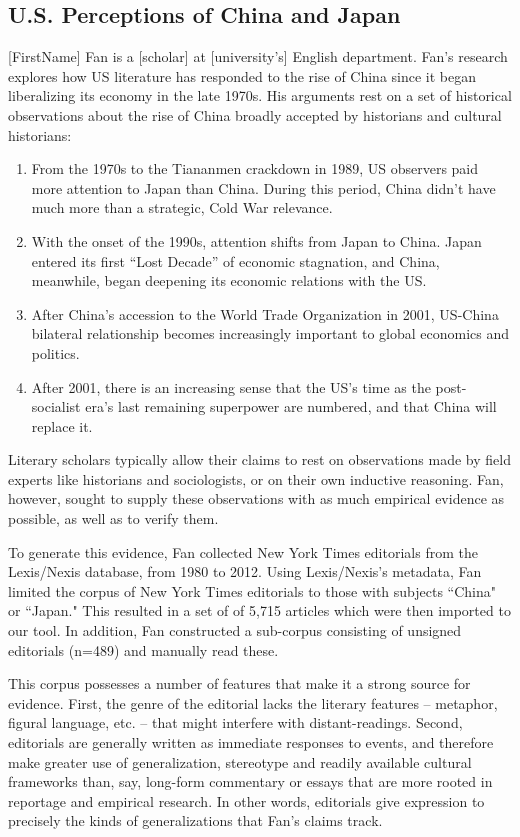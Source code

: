 \documentclass{sig-alternate}
\begin{document}
\subsection{U.S. Perceptions of China and Japan}
[FirstName] Fan is a [scholar] at [university's] English department. Fan's research explores how US literature has responded to the rise of China since it began liberalizing its economy in the late 1970s.  His arguments rest on a set of historical observations about the rise of China  broadly accepted by historians and cultural historians: 
\begin{enumerate}
\item From the 1970s to the Tiananmen crackdown in 1989, US observers paid more attention to Japan than China. During this period, China didn't have much more than a strategic, Cold War relevance. 
\item With the onset of the 1990s, attention shifts from Japan to China. Japan entered its first ``Lost Decade'' of economic stagnation, and China, meanwhile, began deepening its economic relations with the US.
\item After China's accession to the World Trade Organization in 2001, US-China bilateral relationship becomes increasingly important to global economics and politics.
\item After 2001, there is an increasing sense that the US's time as the post-socialist era's last remaining superpower are numbered, and that China will replace it.
\end{enumerate}
Literary scholars typically allow their claims to rest on observations made by field experts like historians and sociologists, or on their own inductive reasoning. Fan, however, sought to supply these observations with as much empirical evidence as possible, as well as to verify them.

To generate this evidence, Fan collected New York Times editorials from  the Lexis/Nexis database, from 1980 to 2012. Using Lexis/Nexis's metadata, Fan limited the corpus of New York Times editorials to those with subjects ``China" or ``Japan." This resulted in a set of of 5,715 articles which were then imported to our tool. In addition, Fan constructed a sub-corpus consisting of unsigned editorials (n=489) and manually read these.

This corpus possesses a number of features that make it a strong source for evidence. First, the genre of the editorial lacks the literary features -- metaphor, figural language, etc. -- that might interfere with distant-readings. Second, editorials are generally written as immediate responses to events, and therefore make greater use of generalization, stereotype and readily available cultural frameworks than, say, long-form commentary or essays that are more rooted in reportage and empirical research. In other words, editorials give expression to precisely the kinds of generalizations that Fan's claims track.
\end{document}
